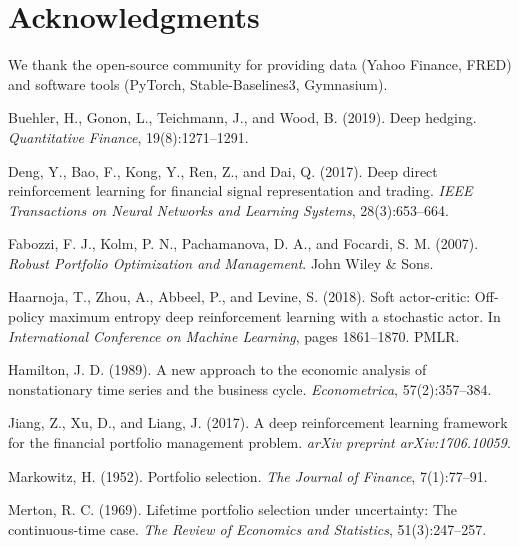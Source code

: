 \documentclass[12pt]{article}
\begin{document}
\section*{Acknowledgments}

We thank the open-source community for providing data (Yahoo Finance, FRED) and software tools (PyTorch, Stable-Baselines3, Gymnasium).


\begin{thebibliography}{99}

Buehler, H., Gonon, L., Teichmann, J., and Wood, B. (2019).
\newblock Deep hedging.
\newblock \emph{Quantitative Finance}, 19(8):1271--1291.

Deng, Y., Bao, F., Kong, Y., Ren, Z., and Dai, Q. (2017).
\newblock Deep direct reinforcement learning for financial signal representation and trading.
\newblock \emph{IEEE Transactions on Neural Networks and Learning Systems}, 28(3):653--664.

Fabozzi, F. J., Kolm, P. N., Pachamanova, D. A., and Focardi, S. M. (2007).
\newblock \emph{Robust Portfolio Optimization and Management}.
\newblock John Wiley \& Sons.

Haarnoja, T., Zhou, A., Abbeel, P., and Levine, S. (2018).
\newblock Soft actor-critic: Off-policy maximum entropy deep reinforcement learning with a stochastic actor.
\newblock In \emph{International Conference on Machine Learning}, pages 1861--1870. PMLR.

Hamilton, J. D. (1989).
\newblock A new approach to the economic analysis of nonstationary time series and the business cycle.
\newblock \emph{Econometrica}, 57(2):357--384.

Jiang, Z., Xu, D., and Liang, J. (2017).
\newblock A deep reinforcement learning framework for the financial portfolio management problem.
\newblock \emph{arXiv preprint arXiv:1706.10059}.

Markowitz, H. (1952).
\newblock Portfolio selection.
\newblock \emph{The Journal of Finance}, 7(1):77--91.

Merton, R. C. (1969).
\newblock Lifetime portfolio selection under uncertainty: The continuous-time case.
\newblock \emph{The Review of Economics and Statistics}, 51(3):247--257.


\end{thebibliography}
\end{document}
